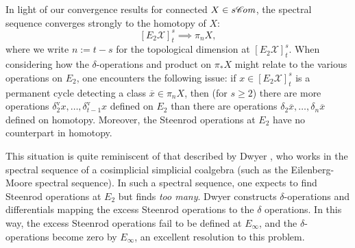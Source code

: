 \documentclass[11pt]{amsart} \renewcommand{\baselinestretch}{1.2}
\theoremstyle{plain}
\numberwithin{equation}{section} %
\theoremstyle{plain}
\numberwithin{equation}{chapter} %
\newcommand{\scrC}{\mathscr{C}}
\newcommand{\calx}{\mathcal{X}}
\newcommand{\algs}{{\scrC\!\textit{\normalfont\textit{om}}}}
\newcommand{\E}[5]{[E^{#1}_{#2}#3]^{#4}_{#5}}
\newcommand{\uver}{^\mathrm{v}}
\newcommand{\deltav}{\delta\uver}
\begin{document}
\begin{Introduction}
In light of our convergence results for connected $X\in s\algs$, the spectral sequence converges strongly to the homotopy of $X$:
\[\E{}{2}{\calx}{s}{t}\implies \pi_nX,\]
where we write $n:=t-s$ for the topological dimension at $\E{}{2}{\calx}{s}{t}$. When considering how the $\delta$-operations and product on $\pi_*X$ might relate to the various operations on $E_2$, one encounters
the following issue: if $x\in \E{}{2}{\calx}{s}{t}$ is  a permanent cycle detecting  a class $\overline{x}\in \pi_nX$, then  (for $s\geq2$) there are more operations $\deltav_2x,\ldots,\deltav_{t-1}x$ defined on $E_2$ than there are operations $\delta_2\overline{x},\ldots,\delta_{n}\overline{x}$ defined on homotopy.  Moreover, the Steenrod operations at $E_2$ have no counterpart in homotopy.

This situation is quite reminiscent of that described by Dwyer \cite{DwyerHigherDividedSquares.pdf}, who works in the spectral sequence of a cosimplicial simplicial coalgebra (such as the Eilenberg-Moore spectral sequence). In such a spectral sequence, one expects to find Steenrod operations at $E_2$ but finds \emph{too many}. Dwyer constructs $\delta$-operations and differentials mapping the excess Steenrod operations to the $\delta$ operations. In this way, the excess Steenrod operations fail to be defined at $E_\infty$, and the $\delta$-operations become zero by $E_\infty$, an excellent resolution to this problem.


\end{Introduction}
\end{document}
